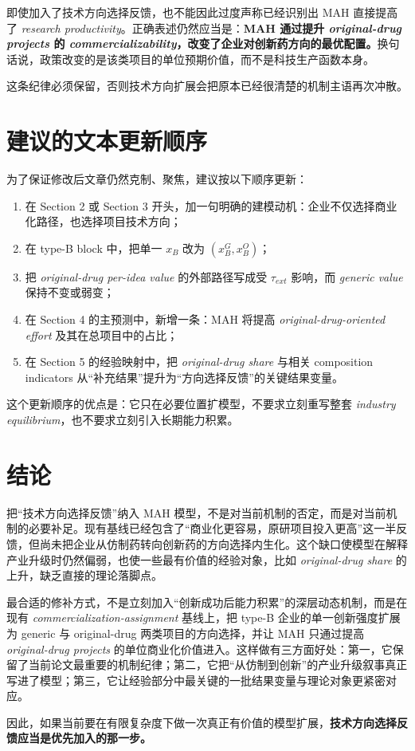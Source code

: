 \documentclass[12pt]{ctexart}
\begin{document}
即使加入了技术方向选择反馈，也不能因此过度声称已经识别出 MAH 直接提高了 \textit{research productivity}。正确表述仍然应当是：\textbf{MAH 通过提升 \textit{original-drug projects} 的 \textit{commercializability}，改变了企业对创新药方向的最优配置。}换句话说，政策改变的是该类项目的单位预期价值，而不是科技生产函数本身。

这条纪律必须保留，否则技术方向扩展会把原本已经很清楚的机制主语再次冲散。

\section{建议的文本更新顺序}

为了保证修改后文章仍然克制、聚焦，建议按以下顺序更新：
\begin{enumerate}[leftmargin=2em]
    \item 在 Section 2 或 Section 3 开头，加一句明确的建模动机：企业不仅选择商业化路径，也选择项目技术方向；
    \item 在 type-B block 中，把单一 $x_B$ 改为 $(x_B^G,x_B^O)$；
    \item 把 \textit{original-drug per-idea value} 的外部路径写成受 $\tau_{ext}$ 影响，而 \textit{generic value} 保持不变或弱变；
    \item 在 Section 4 的主预测中，新增一条：MAH 将提高 \textit{original-drug-oriented effort} 及其在总项目中的占比；
    \item 在 Section 5 的经验映射中，把 \textit{original-drug share} 与相关 composition indicators 从“补充结果”提升为“方向选择反馈”的关键结果变量。
\end{enumerate}
这个更新顺序的优点是：它只在必要位置扩模型，不要求立刻重写整套 \textit{industry equilibrium}，也不要求立刻引入长期能力积累。

\section{结论}

把“技术方向选择反馈”纳入 MAH 模型，不是对当前机制的否定，而是对当前机制的必要补足。现有基线已经包含了“商业化更容易，原研项目投入更高”这一半反馈，但尚未把企业从仿制药转向创新药的方向选择内生化。这个缺口使模型在解释产业升级时仍然偏弱，也使一些最有价值的经验对象，比如 \textit{original-drug share} 的上升，缺乏直接的理论落脚点。

最合适的修补方式，不是立刻加入“创新成功后能力积累”的深层动态机制，而是在现有 \textit{commercialization-assignment} 基线上，把 type-B 企业的单一创新强度扩展为 generic 与 original-drug 两类项目的方向选择，并让 MAH 只通过提高 \textit{original-drug projects} 的单位商业化价值进入。这样做有三方面好处：第一，它保留了当前论文最重要的机制纪律；第二，它把“从仿制到创新”的产业升级叙事真正写进了模型；第三，它让经验部分中最关键的一批结果变量与理论对象更紧密对应。

因此，如果当前要在有限复杂度下做一次真正有价值的模型扩展，\textbf{技术方向选择反馈应当是优先加入的那一步。}
\end{document}
